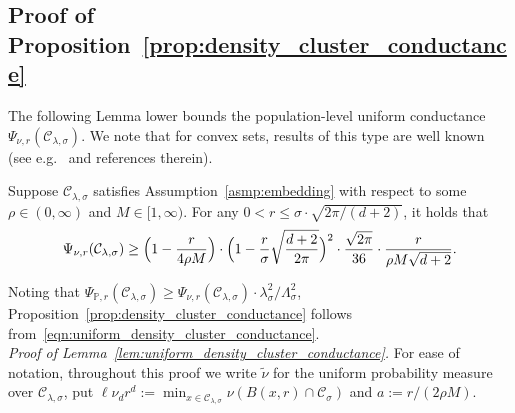 \documentclass[twoside,11pt]{article}
\newcommand{\1}{\mathbf{1}}
\newcommand{\mc}[1]{\mathcal{#1}}
\newcommand{\Pbb}{\mathbb{P}}
\newcommand{\wt}[1]{\widetilde{#1}}
\begin{document}
\subsection{Proof of Proposition~\ref{prop:density_cluster_conductance}}
\label{subsec:density_cluster_conductance}
The following Lemma lower bounds the population-level uniform conductance $\Psi_{\nu,r}(\mc{C}_{\lambda,\sigma})$. We note that for convex sets, results of this type are well known (see e.g.~\cite{vempala2005} and references therein).  
\begin{lemma}
	\label{lem:uniform_density_cluster_conductance}
	Suppose $\mc{C}_{\lambda,\sigma}$ satisfies Assumption~\ref{asmp:embedding} with respect to some $\rho \in (0,\infty)$ and $M \in [1,\infty)$. For any $0 < r \leq \sigma \cdot \sqrt{2\pi/(d + 2)}$, it holds that
	\begin{equation}
	\label{eqn:uniform_density_cluster_conductance}
	\Psi_{\nu,r}(\mc{C}_{\lambda,\sigma}) \geq \Bigl(1 - \frac{r}{4\rho M}\Bigr) \cdot \Bigl(1 - \frac{r}{\sigma}\sqrt{\frac{d + 2}{2\pi}}\Bigr)^2 \cdot \frac{\sqrt{2\pi}}{36} \cdot \frac{r}{\rho M \sqrt{d + 2}}.
	\end{equation}
\end{lemma}
Noting that $\Psi_{\Pbb,r}(\mc{C}_{\lambda,\sigma}) \geq \Psi_{\nu,r}(\mc{C}_{\lambda,\sigma}) \cdot \lambda_{\sigma}^2/\Lambda_{\sigma}^2$, Proposition~\ref{prop:density_cluster_conductance} follows from~\eqref{eqn:uniform_density_cluster_conductance}. \\

\noindent \emph{Proof of Lemma~\ref{lem:uniform_density_cluster_conductance}.}
For ease of notation, throughout this proof we write $\wt{\nu}$ for the uniform probability measure over $\mc{C}_{\lambda,\sigma}$, put $\ell \nu_d r^d := \min_{x \in \mc{C}_{\lambda,\sigma}}\nu(B(x,r) \cap \mc{C}_{\sigma})$ and $a := r/(2\rho M)$. 
\end{document}
